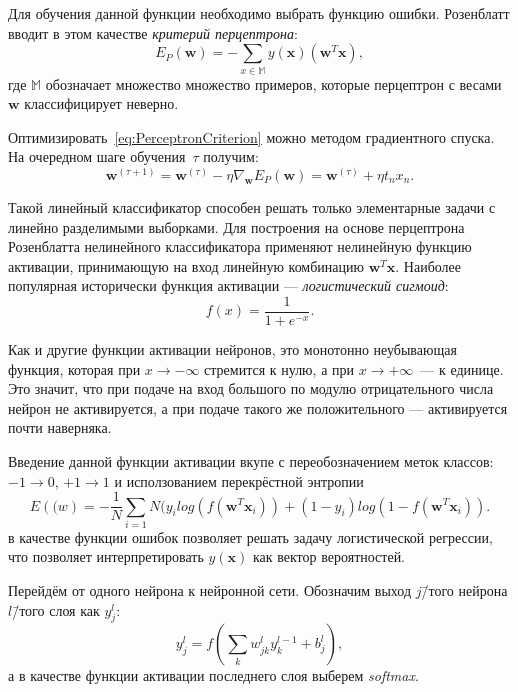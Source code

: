 Для обучения данной функции необходимо выбрать функцию ошибки. Розенблатт вводит в этом качестве \textit{критерий перцептрона}:
\begin{equation}
E_P(\mathbf{w}) = - \sum_{x \in \mathbb{M}} y(\mathbf{x})(\mathbf{w}^T\mathbf{x}),
\label{eq:PerceptronCriterion}
\end{equation}
где $ \mathbb{M} $ обозначает множество множество примеров, которые перцептрон с весами $ \mathbf{w} $ классифицирует неверно.

Оптимизировать~\ref{eq:PerceptronCriterion} можно методом градиентного спуска. На очередном шаге обучения~$ \tau $ получим:
\begin{equation*}
\mathbf{w}^{(\tau + 1)} = \mathbf{w}^{(\tau)} - \eta\nabla_{\mathbf{w}}E_P(\mathbf{w}) = \mathbf{w}^{(\tau)} + {\eta}t_nx_n.
\end{equation*}

Такой линейный классификатор способен решать только элементарные задачи с линейно разделимыми выборками. Для построения на основе перцептрона Розенблатта нелинейного классификатора применяют нелинейную функцию активации, принимающую на вход линейную комбинацию $ \mathbf{w}^T\mathbf{x} $. Наиболее популярная исторически функция активации --- \textit{логистический сигмоид}:
\begin{equation*}
f(x) = \frac{1}{1 + e^{-x}}.
\end{equation*}

Как и другие функции активации нейронов, это монотонно неубывающая функция, которая при $ x \to -\infty $ стремится к нулю, а при $ x \to +\infty $~--- к единице. Это значит, что при подаче на вход большого по модулю отрицательного числа нейрон не активируется, а при подаче такого же положительного --- активируется почти наверняка.

Введение данной функции активации вкупе с переобозначением меток классов: $ -1 \to 0 $, $ +1 \to 1 $ и исползованием перекрёстной энтропии
\begin{equation*}
E(\mathbf(w) = -\frac{1}{N}\sum_{i = 1}{N} (y_ilog(f(\mathbf{w}^T\mathbf{x}_i)) + (1 - y_i)log(1 - f(\mathbf{w}^T\mathbf{x}_i)).
\end{equation*}
в качестве функции ошибок позволяет решать задачу логистической регрессии, что позволяет интерпретировать $ y(\mathbf{x}) $ как вектор вероятностей.

Перейдём от одного нейрона к нейронной сети. Обозначим выход $ j $\=/того нейрона $ l $\=/того слоя как $ y_j^l $:
\begin{equation*}
y_j^l = f(\sum_k w_{jk}^ly_k^{l - 1} + b_j^l),
\end{equation*}
а в качестве функции активации последнего слоя выберем \textit{softmax}.

